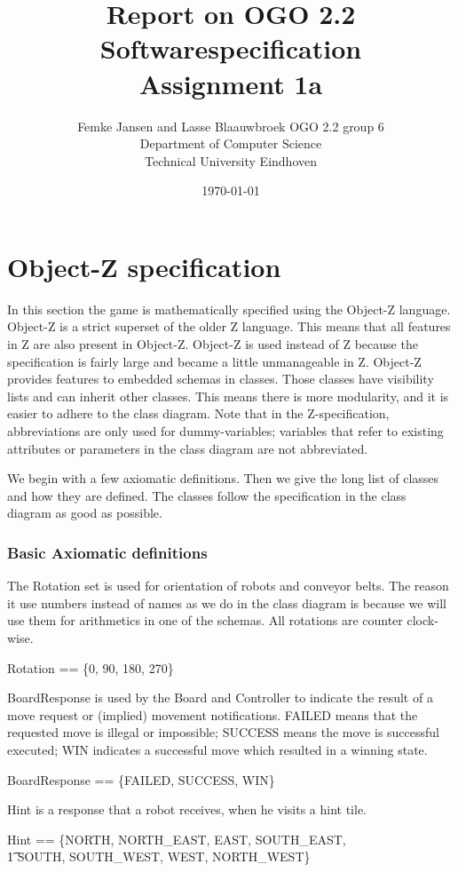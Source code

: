 \documentclass[12pt]{article}
\title{Report on OGO 2.2 Softwarespecification\\ Assignment 1a}
\author{
        Femke Jansen and Lasse Blaauwbroek OGO 2.2 group 6 \\
                Department of Computer Science\\
        Technical University Eindhoven\\
}
\date{\today}
\begin{document}
\maketitle

\section{Object-Z specification}
In this section the game is mathematically specified using the Object-Z language. Object-Z is a strict superset of the older Z language. This means that all features in Z are also present in Object-Z. Object-Z is used instead of Z because the specification is fairly large and became a little unmanageable in Z. Object-Z provides features to embedded schemas in classes. Those classes have visibility lists and can inherit other classes. This means there is more modularity, and it is easier to adhere to the class diagram.
Note that in the Z-specification, abbreviations are only used for dummy-variables; variables that refer to existing attributes or parameters in the class diagram are not abbreviated.

We begin with a few axiomatic definitions. Then we give the long list of classes and how they are defined. The classes follow the specification in the class diagram as good as possible.

\subsubsection{Basic Axiomatic definitions}
The Rotation set is used for orientation of robots and conveyor belts. The reason it use numbers instead of names as we do in the class diagram is because we will use them for arithmetics in one of the schemas. All rotations are counter clock-wise.
\begin{axdef}
Rotation == \{0, 90, 180, 270\}
\end{axdef}

BoardResponse is used by the Board and Controller to indicate the result of a move request or (implied) movement notifications. FAILED means that the requested move is illegal or impossible; SUCCESS means the move is successful executed; WIN indicates a successful move which resulted in a winning state.
\begin{axdef}
BoardResponse == \{FAILED, SUCCESS, WIN\}
\end{axdef}

Hint is a response that a robot receives, when he visits a hint tile.
\begin{axdef}
Hint == \{NORTH, NORTH\_EAST, EAST, SOUTH\_EAST, \\ \t1 SOUTH, SOUTH\_WEST, WEST, NORTH\_WEST\}
\end{axdef}
\end{document}

